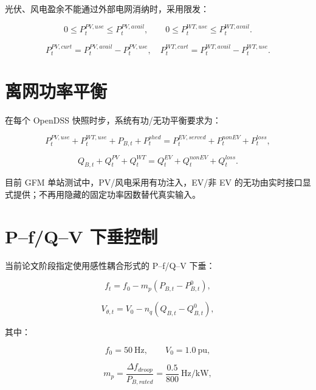 \documentclass[UTF8,a4paper,11pt]{ctexart}
\begin{document}
光伏、风电盈余不能通过外部电网消纳时，采用限发：

\begin{equation}
0\leq P^{PV,use}_t\leq P^{PV,avail}_t,
\qquad
0\leq P^{WT,use}_t\leq P^{WT,avail}_t.
\end{equation}

\begin{equation}
P^{PV,curt}_t=P^{PV,avail}_t-P^{PV,use}_t,
\quad
P^{WT,curt}_t=P^{WT,avail}_t-P^{WT,use}_t.
\end{equation}

\section{离网功率平衡}

在每个 OpenDSS 快照时步，系统有功/无功平衡要求为：

\begin{equation}
P^{PV,use}_t+P^{WT,use}_t+P_{B,t}
+
P^{shed}_t
=
P^{EV,served}_t+P^{nonEV}_t+P^{loss}_t,
\end{equation}

\begin{equation}
Q_{B,t}+Q^{PV}_t+Q^{WT}_t
=
Q^{EV}_t+Q^{nonEV}_t+Q^{loss}_t.
\end{equation}

目前 GFM 单站测试中，PV/风电采用有功注入，EV/非 EV 的无功由实时接口显式提供；不再用隐藏的固定功率因数替代真实输入。

\section{P--f/Q--V 下垂控制}

当前论文阶段指定使用感性耦合形式的 P--f/Q--V 下垂：

\begin{equation}
f_t=f_0-m_p\left(P_{B,t}-P_{B,t}^{0}\right),
\end{equation}

\begin{equation}
V_{\theta,t}=V_0-n_q\left(Q_{B,t}-Q_{B,t}^{0}\right),
\end{equation}

其中：

\begin{equation}
f_0=50\ \text{Hz},\qquad V_0=1.0\ \text{pu},
\end{equation}

\begin{equation}
m_p=\frac{\Delta f_{droop}}{P_{B,rated}}
=\frac{0.5}{800}\ \text{Hz/kW},
\end{equation}
\end{document}
